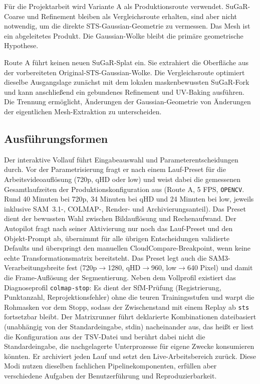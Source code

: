 Für die Projektarbeit wird Variante A als Produktionsroute verwendet. SuGaR-
Coarse und Refinement bleiben als Vergleichsroute erhalten, sind aber nicht
notwendig, um die direkte STS-Gaussian-Geometrie zu vermessen. Das Mesh ist ein
abgeleitetes Produkt. Die Gaussian-Wolke bleibt die primäre geometrische
Hypothese.

Route A führt keinen neuen SuGaR-Splat ein. Sie extrahiert die Oberfläche aus
der vorbereiteten Original-STS-Gaussian-Wolke. Die Vergleichsroute optimiert
dieselbe Ausgangslage zunächst mit dem lokalen maskenbewussten SuGaR-Fork und
kann anschließend ein gebundenes Refinement und UV-Baking ausführen. Die
Trennung ermöglicht, Änderungen der Gaussian-Geometrie von Änderungen der
eigentlichen Mesh-Extraktion zu unterscheiden.

\subsection{Ausführungsformen}

Der interaktive Vollauf führt Eingabeauswahl und Parameterentscheidungen durch.
Vor der Parametrisierung fragt er nach einem Lauf-Preset für die
Arbeitsvideoauflösung (720p, qHD oder low) und weist dabei die gemessenen
Gesamtlaufzeiten der Produktionskonfiguration aus (Route A, 5 FPS,
\texttt{OPENCV}. Rund 40 Minuten bei 720p, 34 Minuten bei qHD und 24 Minuten
bei low, jeweils inklusive SAM~3.1-, COLMAP-, Render- und Archivierungsanteil). Das Preset dient der bewussten Wahl zwischen Bildauflösung und Rechenaufwand.
Der Autopilot fragt nach seiner Aktivierung nur noch das Lauf-Preset und den
Objekt-Prompt ab, übernimmt für alle übrigen Entscheidungen validierte
Defaults und überspringt den manuellen
CloudCompare-Breakpoint, wenn keine echte Transformationsmatrix bereitsteht.
Das Preset legt auch die SAM3-Verarbeitungsbreite fest (720p$\to$1280,
qHD$\to$960, low$\to$640 Pixel) und damit die Frame-Auflösung der
Segmentierung. Neben dem Vollprofil existiert das Diagnoseprofil
\texttt{colmap-stop}: Es dient der SfM-Prüfung (Registrierung, Punktanzahl,
Reprojektionsfehler) ohne die teuren Trainingsstufen und warpt die Rohmasken
vor dem Stopp, sodass der Zwischenstand mit einem Replay ab \texttt{sts}
fortsetzbar bleibt.
Der Matrixrunner führt deklarierte Kombinationen dateibasiert
(unabhängig von der Standardeingabe, stdin) nacheinander aus, das heißt er liest die Konfiguration aus
der TSV-Datei und berührt dabei nicht die Standardeingabe, die nachgelagerte
Unterprozesse für eigene Zwecke konsumieren könnten. Er archiviert jeden Lauf
und setzt den Live-Arbeitsbereich zurück. Diese Modi nutzen dieselben
fachlichen Pipelinekomponenten, erfüllen aber verschiedene Aufgaben der
Benutzerführung und Reproduzierbarkeit.

